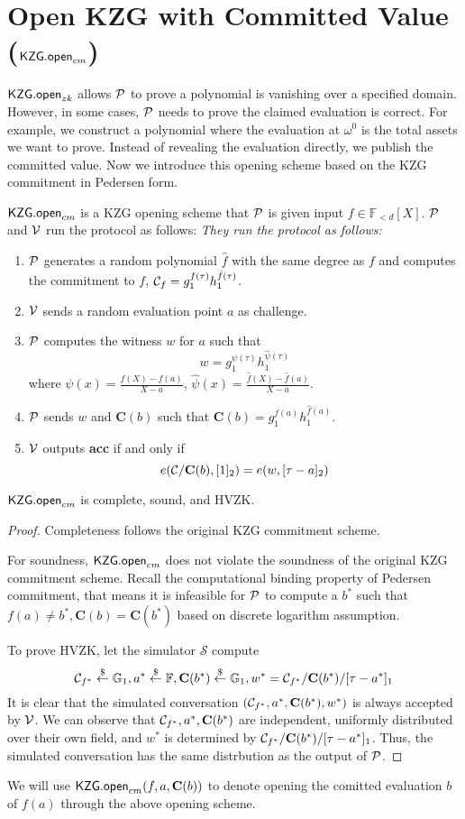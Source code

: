 \section{Open KZG with Committed Value ($\openc$)}
\label{sec:kzgOpenComm}
$\mathsf{KZG.open}_{zk}$ allows $\mathcal{P}$ to prove a polynomial is vanishing over a specified domain. However, in some cases, $\mathcal{P}$ needs to prove the claimed evaluation is correct. For example, we construct a polynomial where the evaluation at $\omega^0$ is the total assets we want to prove. Instead of revealing the evaluation directly, we publish the committed value. Now we introduce this opening scheme based on the KZG commitment in Pedersen form.
\begin{definition}[$\openc$]
$\openc$ is a KZG opening scheme that $\mathcal{P}$ is given input $f\in\mathbb{F}_{<d}[X]$. $\mathcal{P}$ and $\mathcal{V}$ run the protocol as follows:
\textit{They run the protocol as follows:}
\begin{enumerate}
    \item $\mathcal{P}$ generates a random polynomial $\hat{f}$ with the same degree as $f$ and computes the commitment to $f$, $\mathcal{C}_f=g_1^{f(\tau)}h_1^{\hat{f}(\tau)}$.
    \item $\mathcal{V}$ sends a random evaluation point $a$ as challenge.
    \item $\mathcal{P}$ computes the witness $w$ for $a$ such that
    \[ w=g_1^{\psi(\tau)}h_1^{\hat\psi(\tau)} \]
    where $\psi(x)=\frac{f(X)-f(a)}{X-a}$, $\hat\psi(x)=\frac{\hat{f}(X)-\hat{f}(a)}{X-a}$.
    \item $\mathcal{P}$ sends $w$ and $\textbf{C}(b)$ such that $\textbf{C}(b)=g_1^{f(a)}h_1^{\hat{f}(a)}$.
    \item $\mathcal{V}$ outputs \textbf{acc} if and only if
    \[ e(\mathcal{C}/\textbf{C}(b),[1]_2)=e(w,[\tau-a]_2) \]
\end{enumerate}
\end{definition}
\begin{theorem}
\label{thm:kzgOpenComm}
$\openc$ is complete, sound, and HVZK.
\end{theorem}
\begin{proof}
Completeness follows the original KZG commitment scheme.

For soundness, $\openc$ does not violate the soundness of the original KZG commitment scheme. Recall the computational binding property of Pedersen commitment, that means it is infeasible for $\mathcal{P}$ to compute a $b^*$ such that $f(a)\ne{b^*},\textbf{C}(b)=\textbf{C}(b^*)$ based on discrete logarithm assumption.

To prove HVZK, let the simulator $\mathcal{S}$ compute
$$
\mathcal{C}_{f^*}\stackrel{\$}{\leftarrow}\mathbb{G}_1,a^*\stackrel{\$}{\leftarrow}\mathbb{F},\textbf{C}(b^*)\stackrel{\$}{\leftarrow}\mathbb{G}_1,w^*=\mathcal{C}_{f^*}/\textbf{C}(b^*)/[\tau-a^*]_1
$$
It is clear that the simulated conversation $(\mathcal{C}_{f^*},a^*,\textbf{C}(b^*),w^*)$  is always accepted by $\mathcal{V}$. We can observe that $\mathcal{C}_{f^*},a^*,\textbf{C}(b^*)$ are independent, uniformly distributed over their own field, and $w^*$ is determined by $\mathcal{C}_{f^*}/\textbf{C}(b^*)/[\tau-a^*]_1$. Thus, the simulated conversation has the same distrbution as the output of $\mathcal{P}$.
\end{proof}

We will use $\mathsf{KZG.open}_{cm}(f,a,\textbf{C}(b))$ to denote opening the comitted evaluation $b$ of $f(a)$ through the above opening scheme.
